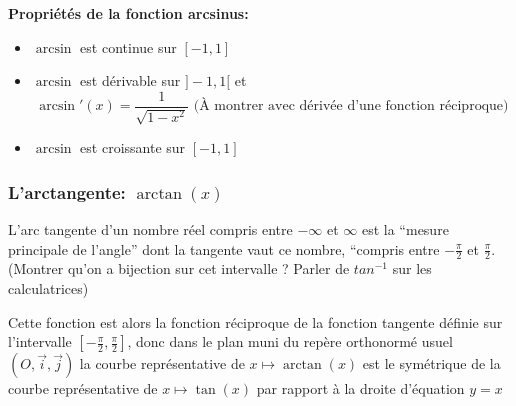 \textbf{Propriétés de la fonction arcsinus: }
\begin{itemize}[label=$\bullet$, leftmargin=2cm]
\item $\arcsin$ est continue sur  $[-1,1]$
\item $\arcsin$ est dérivable sur $]-1,1[$ et
  \[
    \arcsin'(x)=\frac{1}{\sqrt{1-x^2}} \text{ (À montrer avec dérivée
      d'une fonction réciproque)}
  \]
\item $\arcsin$ est croissante sur $[-1,1]$
\end{itemize}

\subsubsection{L'arctangente: $\arctan(x)$}

L'arc tangente d'un nombre réel compris entre $-\infty$ et $\infty$ est la ``mesure principale
de l'angle'' dont la tangente vaut ce nombre, ``compris entre  $-\frac{\pi}{2}$ et
$\frac{\pi}{2}$. (Montrer qu'on a bijection sur cet intervalle ? Parler de $tan^{-1}$ sur
les calculatrices)

Cette fonction est alors la fonction réciproque de la fonction tangente définie
sur l'intervalle $[-\frac{\pi}{2},\frac{\pi}{2}]$, donc dans le plan muni du repère orthonormé usuel
$(O,\vec{i}, \vec{j})$ la courbe représentative de $x \mapsto \arctan(x)$ est le
symétrique de la courbe représentative de $x \mapsto \tan(x)$ par rapport à
la droite d'équation $y=x$

\begin{center}
\end{center}

